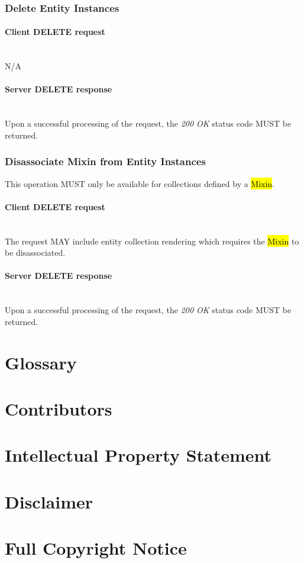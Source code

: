 \documentclass[10pt,a4paper]{article}
\begin{document}
\subsubsection{Delete Entity Instances}

\paragraph*{Client DELETE request}\hfill\\
N/A

\paragraph*{Server DELETE response}\hfill\\
Upon a successful processing of the request, the \emph{200 OK} status code MUST be returned.

\subsubsection{Disassociate Mixin from Entity Instances}
This operation MUST only be available for collections defined by a \hl{Mixin}.

\paragraph*{Client DELETE request}\hfill\\
The request MAY include entity collection rendering which requires the \hl{Mixin} to be disassociated.

\paragraph*{Server DELETE response}\hfill\\
Upon a successful processing of the request, the \emph{200 OK} status code MUST be returned.

\section{Glossary}
\label{sec:glossary}


\section{Contributors}


\section{Intellectual Property Statement}


\section{Disclaimer}


\section{Full Copyright Notice}




\end{document}
